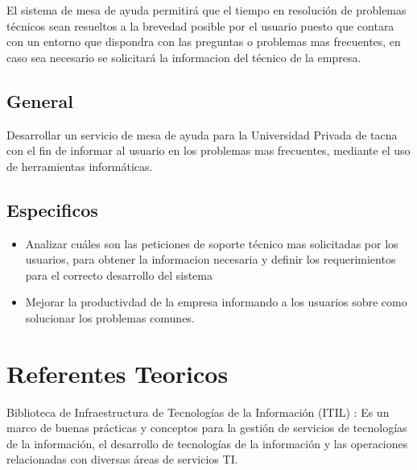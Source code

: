 \documentclass[preprint,12pt]{elsarticle}
\begin{document}
El sistema de mesa de ayuda permitirá que el tiempo en resolución de problemas técnicos sean resueltos a la brevedad posible por el usuario puesto que contara con un entorno que dispondra con las preguntas o problemas mas frecuentes, en caso sea necesario se solicitará la informacion del técnico de la empresa.




\subsection{\textbf{General}}

Desarrollar un servicio de mesa de ayuda para la Universidad Privada de tacna con el fin de informar al usuario en los problemas mas frecuentes, mediante el uso de herramientas informáticas.


\subsection{\textbf{Especificos}}

\begin{itemize}

\item Analizar cuáles son las peticiones de soporte técnico mas solicitadas por los usuarios, para obtener la informacion necesaria y definir los requerimientos para el correcto desarrollo del sistema
\item Mejorar la productivdad de la empresa informando a los usuarios sobre como solucionar los problemas comunes.
\end{itemize}


 


\section{Referentes Teoricos}
Biblioteca de Infraestructura de Tecnologías de la Información (ITIL) : Es un marco de buenas prácticas y conceptos para la gestión de servicios de tecnologías de la información, el desarrollo de tecnologías de la información y las operaciones relacionadas con diversas áreas de servicios TI.
\end{document}
